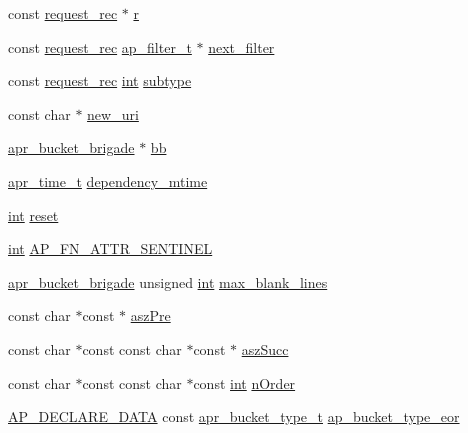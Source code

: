 \begin{DoxyCompactItemize}
\item 
const \hyperlink{structrequest__rec}{request\+\_\+rec} $\ast$ \hyperlink{group__APACHE__CORE__REQ_gac68e921ed15f71060d618adb662a84f6}{r}
\item 
const \hyperlink{structrequest__rec}{request\+\_\+rec} \hyperlink{structap__filter__t}{ap\+\_\+filter\+\_\+t} $\ast$ \hyperlink{group__APACHE__CORE__REQ_ga9152b2a73566c0e87928a82d0e659c6c}{next\+\_\+filter}
\item 
const \hyperlink{structrequest__rec}{request\+\_\+rec} \hyperlink{pcre_8txt_a42dfa4ff673c82d8efe7144098fbc198}{int} \hyperlink{group__APACHE__CORE__REQ_ga97af40e4dc8153104d9082d37b6b2fa2}{subtype}
\item 
const char $\ast$ \hyperlink{group__APACHE__CORE__REQ_ga65e3869c33c434213e1bc568332c0df9}{new\+\_\+uri}
\item 
\hyperlink{structapr__bucket__brigade}{apr\+\_\+bucket\+\_\+brigade} $\ast$ \hyperlink{group__APACHE__CORE__REQ_ga0b0eadb381dbe958da483f3d9fc9521a}{bb}
\item 
\hyperlink{group__apr__time_gadb4bde16055748190eae190c55aa02bb}{apr\+\_\+time\+\_\+t} \hyperlink{group__APACHE__CORE__REQ_ga44cf232eb640c16f9ea6a13aa709de6a}{dependency\+\_\+mtime}
\item 
\hyperlink{pcre_8txt_a42dfa4ff673c82d8efe7144098fbc198}{int} \hyperlink{group__APACHE__CORE__REQ_gadb7a760512715e86f925f8a8d4a15ba8}{reset}
\item 
\hyperlink{pcre_8txt_a42dfa4ff673c82d8efe7144098fbc198}{int} \hyperlink{group__APACHE__CORE__REQ_gac44af73ffaebb0b0ea73427af1b12278}{A\+P\+\_\+\+F\+N\+\_\+\+A\+T\+T\+R\+\_\+\+S\+E\+N\+T\+I\+N\+EL}
\item 
\hyperlink{structapr__bucket__brigade}{apr\+\_\+bucket\+\_\+brigade} unsigned \hyperlink{pcre_8txt_a42dfa4ff673c82d8efe7144098fbc198}{int} \hyperlink{group__APACHE__CORE__REQ_ga8981c00bd5fdeab9cb31b1ce3c0d9d7e}{max\+\_\+blank\+\_\+lines}
\item 
const char $\ast$const $\ast$ \hyperlink{group__APACHE__CORE__REQ_ga9284516b51e24684b08b5c57c37caab0}{asz\+Pre}
\item 
const char $\ast$const const char $\ast$const $\ast$ \hyperlink{group__APACHE__CORE__REQ_gac81dbaa02f4fa673770cecc73f7d2b1d}{asz\+Succ}
\item 
const char $\ast$const const char $\ast$const \hyperlink{pcre_8txt_a42dfa4ff673c82d8efe7144098fbc198}{int} \hyperlink{group__APACHE__CORE__REQ_ga97a1daf1c1f7ee104df3d828c9d844db}{n\+Order}
\item 
\hyperlink{ap__config_8h_a0bb4c3adf74510a0dcdad5b125725fe0}{A\+P\+\_\+\+D\+E\+C\+L\+A\+R\+E\+\_\+\+D\+A\+TA} const \hyperlink{structapr__bucket__type__t}{apr\+\_\+bucket\+\_\+type\+\_\+t} \hyperlink{group__APACHE__CORE__REQ_ga6ad75664a7f2f7673accfabbe67a9fe5}{ap\+\_\+bucket\+\_\+type\+\_\+eor}
\end{DoxyCompactItemize}


